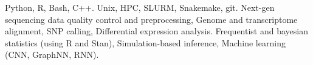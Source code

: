 {}
{Python, R, Bash, C++.}{}
{}
{Unix, HPC, SLURM, Snakemake, git.}{}
{}
{Next-gen sequencing data quality control and preprocessing, Genome and transcriptome alignment, SNP calling, Differential expression analysis.}{}
{}
{Frequentist and bayesian statistics (using R and Stan), Simulation-based inference, Machine learning (CNN, GraphNN, RNN).}{}
